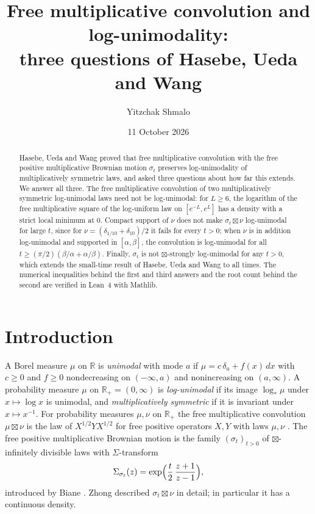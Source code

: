 \documentclass[11pt]{amsart}
\title[Log-unimodality and free multiplicative convolution]{Free multiplicative convolution and log-unimodality:\\ three questions of Hasebe, Ueda and Wang}
\author{Yitzchak Shmalo}
\date{11 October 2026}
\theoremstyle{remark}
\newcommand{\R}{\mathbb R}
\newcommand{\Rp}{\R_{+}}
\begin{document}
\begin{abstract}
Hasebe, Ueda and Wang proved that free multiplicative convolution with the free positive multiplicative Brownian motion $\sigma_t$ preserves log-unimodality of multiplicatively symmetric laws, and asked three questions about how far this extends. We answer all three. The free multiplicative convolution of two multiplicatively symmetric log-unimodal laws need not be log-unimodal: for $L\ge6$, the logarithm of the free multiplicative square of the log-uniform law on $[e^{-L},e^{L}]$ has a density with a strict local minimum at $0$. Compact support of $\nu$ does not make $\sigma_t\boxtimes\nu$ log-unimodal for large $t$, since for $\nu=(\delta_{1/10}+\delta_{10})/2$ it fails for every $t>0$; when $\nu$ is in addition log-unimodal and supported in $[\alpha,\beta]$, the convolution is log-unimodal for all $t\ge(\pi/2)(\beta/\alpha+\alpha/\beta)$. Finally, $\sigma_t$ is not $\boxtimes$-strongly log-unimodal for any $t>0$, which extends the small-time result of Hasebe, Ueda and Wang to all times. The numerical inequalities behind the first and third answers and the root count behind the second are verified in Lean~4 with Mathlib.
\end{abstract}
\maketitle

\section{Introduction}

A Borel measure $\mu$ on $\R$ is \emph{unimodal} with mode $a$ if $\mu=c\,\delta_a+f(x)\,dx$ with $c\ge0$ and $f\ge0$ nondecreasing on $(-\infty,a)$ and nonincreasing on $(a,\infty)$. A probability measure $\mu$ on $\Rp=(0,\infty)$ is \emph{log-unimodal} if its image $\log_*\mu$ under $x\mapsto\log x$ is unimodal, and \emph{multiplicatively symmetric} if it is invariant under $x\mapsto x^{-1}$. For probability measures $\mu,\nu$ on $\Rp$ the free multiplicative convolution $\mu\boxtimes\nu$ is the law of $X^{1/2}YX^{1/2}$ for free positive operators $X,Y$ with laws $\mu,\nu$ \cite{Voi87,BV93}. The free positive multiplicative Brownian motion is the family $(\sigma_t)_{t>0}$ of $\boxtimes$-infinitely divisible laws with $\Sigma$-transform
\[
\Sigma_{\sigma_t}(z)=\exp\Bigl(\frac t2\,\frac{z+1}{z-1}\Bigr),
\]
introduced by Biane \cite{Bia98}. Zhong \cite{Zho15} described $\sigma_t\boxtimes\nu$ in detail; in particular it has a continuous density.
\end{document}
